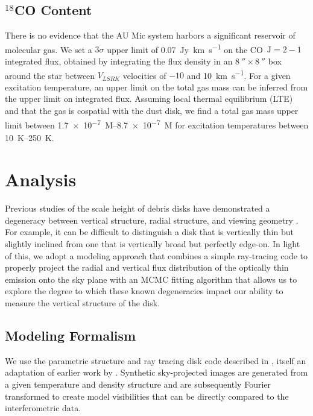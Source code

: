 \documentclass[modern]{aastex62}
\begin{document}
\subsection{$^{18}$CO Content}
\label{subsection: gas}

There is no evidence that the AU Mic system harbors a significant reservoir of molecular gas.
We set a $3 \sigma$ upper limit of \SI{0.07}{Jy.km.s^{-1}} on the CO~$\mathrm{J}=2-1$ integrated flux, obtained by integrating the flux density in an $\SI{8}{\arcsecond} \times \SI{8}{\arcsecond}$ box around the star between $V_{LSRK}$ velocities of $-10$ and \SI{10}{km.s^{-1}}.
For a given excitation temperature, an upper limit on the total gas mass can be inferred from the upper limit on integrated flux.
Assuming local thermal equilibrium (LTE) and that the gas is cospatial with the dust disk, we find a total gas mass upper limit between \SIrange[range-phrase=\ and\ ]{1.7e-7}{8.7e-7}{M_\earth} for excitation temperatures between \SIrange[range-phrase=\ and\ ]{10}{250}{K}.



\section{Analysis}
\label{section: analysis}
Previous studies of the scale height of debris disks have demonstrated a degeneracy between vertical structure, radial structure, and viewing geometry \citep[e.g.][]{milli14}.  
For example, it can be difficult to distinguish a disk that is vertically thin but slightly inclined from one that is vertically broad but perfectly edge-on.
In light of this, we adopt a modeling approach that combines a simple ray-tracing code to properly project the radial and vertical flux distribution of the optically thin emission onto the sky plane with an MCMC fitting algorithm that allows us to explore the degree to which these known degeneracies impact our ability to measure the vertical structure of the disk.  

\subsection{Modeling Formalism}

We use the parametric structure and ray tracing disk code described in \citet{flaherty15}, itself an adaptation of earlier work by \citet{rosenfeld13}.
Synthetic sky-projected images are generated from a given temperature and density structure and are subsequently Fourier transformed to create model visibilities that can be directly compared to the interferometric data.
\end{document}

